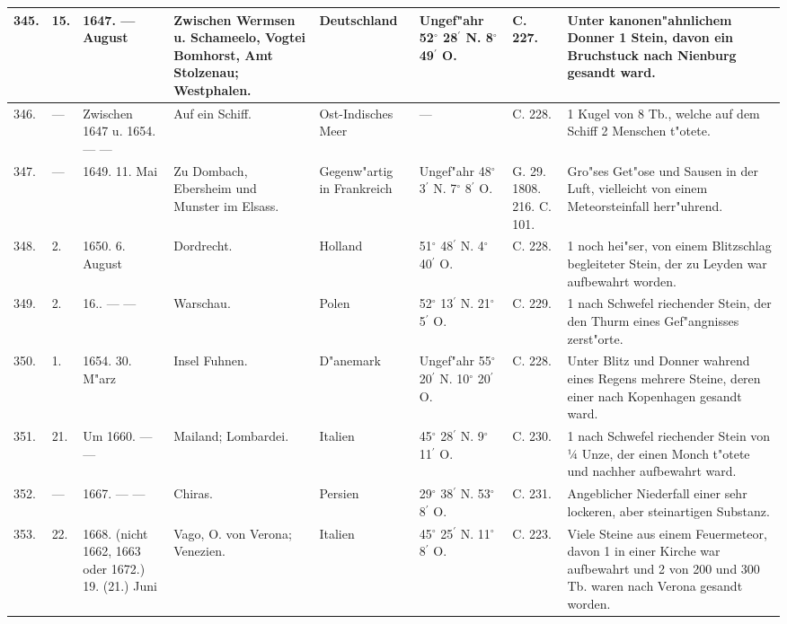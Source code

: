 \documentclass[a4paper, 8pt, oneside, polutonikogreek, german]{article}
\begin{document}
\begin{center}
\begin{longtable}{| p{4mm} | p{2mm} | p{15mm} | p{25mm} | p{16mm} | p{12mm} | p{13mm} | p{20mm} |}
        345. & 15. & 1647. --- August & Zwischen Wermsen u. Schameelo, Vogtei Bomhorst, Amt Stolzenau; Westphalen. & Deutschland & Ungef"ahr 52$^\circ$ 28$^\prime$ N. 8$^\circ$ 49$^\prime$ O. & C. 227. & Unter kanonen"ahnlichem Donner 1 Stein, davon ein Bruchstuck nach Nienburg gesandt ward. \\ \hline
        346. & --- & Zwischen 1647 u. 1654. --- --- & Auf ein Schiff. & Ost-Indisches Meer & --- & C. 228. & 1 Kugel von 8 Tb., welche auf dem Schiff 2 Menschen t"otete. \\ \hline
        347. & --- & 1649. 11. Mai & Zu Dombach, Ebersheim und Munster im Elsass. & Gegenw"artig in Frankreich & Ungef"ahr 48$^\circ$ 3$^\prime$ N. 7$^\circ$ 8$^\prime$ O. & G. 29. 1808. 216. C. 101. & Gro"ses Get"ose und Sausen in der Luft, vielleicht von einem Meteorsteinfall herr"uhrend. \\ \hline
        348. & 2. & 1650. 6. August & Dordrecht. & Holland & 51$^\circ$ 48$^\prime$ N. 4$^\circ$ 40$^\prime$ O. & C. 228. & 1 noch hei"ser, von einem Blitzschlag begleiteter Stein, der zu Leyden war aufbewahrt worden. \\ \hline
        349. & 2. & 16.. --- --- & Warschau. & Polen & 52$^\circ$ 13$^\prime$ N. 21$^\circ$ 5$^\prime$ O. & C. 229. & 1 nach Schwefel riechender Stein, der den Thurm eines Gef"angnisses zerst"orte. \\ \hline
        350. & 1. & 1654. 30. M"arz & Insel Fuhnen. & D"anemark & Ungef"ahr 55$^\circ$ 20$^\prime$ N. 10$^\circ$ 20$^\prime$ O. & C. 228. & Unter Blitz und Donner wahrend eines Regens mehrere Steine, deren einer nach Kopenhagen gesandt ward. \\ \hline
        351. & 21. & Um 1660. --- --- & Mailand; Lombardei. & Italien & 45$^\circ$ 28$^\prime$ N. 9$^\circ$ 11$^\prime$ O. & C. 230. & 1 nach Schwefel riechender Stein von ¼ Unze, der einen Monch t"otete und nachher aufbewahrt ward. \\ \hline
        352. & --- & 1667. --- --- & Chiras. & Persien & 29$^\circ$ 38$^\prime$ N. 53$^\circ$ 8$^\prime$ O. & C. 231. & Angeblicher Niederfall einer sehr lockeren, aber steinartigen Substanz. \\ \hline
        353. & 22. & 1668. (nicht 1662, 1663 oder 1672.) 19. (21.) Juni & Vago, O. von Verona; Venezien. & Italien & 45$^\circ$ 25$^\prime$ N. 11$^\circ$ 8$^\prime$ O. & C. 223. & Viele Steine aus einem Feuermeteor, davon 1 in einer Kirche war aufbewahrt und 2 von 200 und 300 Tb. waren nach Verona gesandt worden. \\ \hline

\end{longtable}
\end{center}
\end{document}

